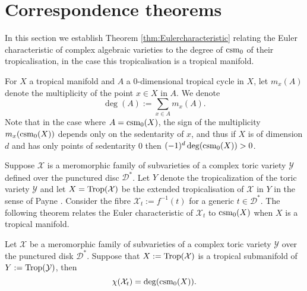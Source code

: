 
\section{Correspondence theorems} 
\label{sec:correspondence}

In this section we establish Theorem \ref{thm:Eulercharacteristic} relating the Euler characteristic of complex algebraic varieties to the degree of $\operatorname{csm}_0$ of their tropicalisation, in the case this tropicalisation is a tropical manifold. 

For $X$ a tropical manifold and $A$ a $0$-dimensional tropical cycle in $X$, let $m_x(A)$ denote the multiplicity of the point $x \in X$ in $A$. 
We denote $$\deg(A) := \sum_{x \in A} m_x(A).$$  
Note that in the case where $A = \operatorname{csm}_0(X)$, 
the sign of the multiplicity $m_x(\operatorname{csm}_0(X))$ depends only on the sedentarity of $x$, 
and thus if $X$ is of dimension $d$ and has only points of sedentarity $0$ 
then $(-1)^d\deg(\operatorname{csm}_0(X)) > 0$.  

 
Suppose  $\mathcal{X}$ is  a meromorphic family of subvarieties of a complex toric variety $\mathcal{Y}$ defined over the punctured disc $ \mathcal{D}^*$. 
 Let $Y$ denote the tropicalization of the toric variety $\mathcal{Y}$ and let $X = \operatorname{Trop}(\mathcal{X})$ be the extended tropicalisation of $\mathcal{X} $ in $Y$  in the sense of Payne \cite{Payne}. 
Consider the fibre $\mathcal{X}_t := f^{-1}(t)$ for a generic $t \in \mathcal{D}^*$. 
The following theorem relates the Euler characteristic of $\mathcal{X}_t$ to $\operatorname{csm}_0(X)$ when $X$ is a tropical manifold. 


\begin{thm}
\label{thm:Eulercharacteristic}
 Let $\mathcal{X}$ be a meromorphic family of subvarieties of a complex toric variety $\mathcal{Y}$ over the punctured disk $\mathcal{D}^*$. Suppose that $X := \operatorname{Trop}(\mathcal{X})$ is a tropical submanifold of $Y := \operatorname{Trop}(\mathcal{Y})$, then 
  $$\chi(\mathcal{X}_t) = \deg(\operatorname{csm}_0(X)).$$
\end{thm}
 
